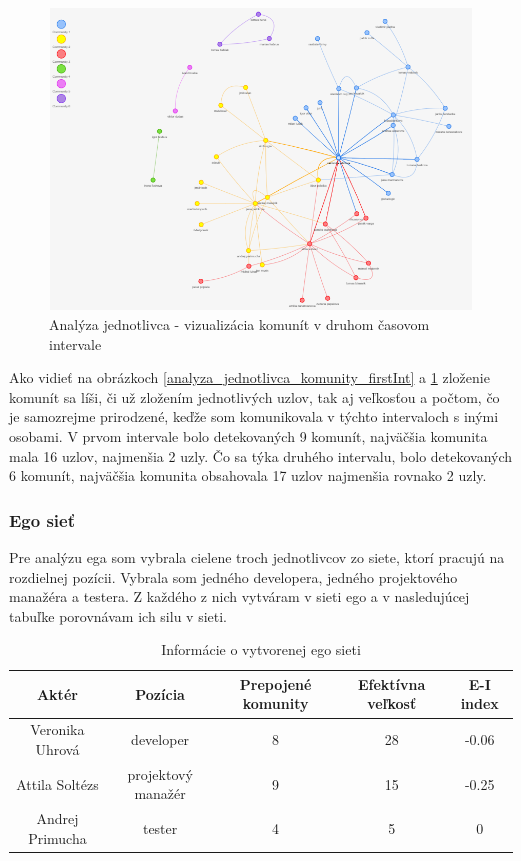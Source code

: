 \documentclass[slovak,master,public,dept460,male,cpdeclaration,oneside]{diploma}
\begin{document}
\begin{figure}[H]
\centering
\includegraphics[width=12cm, height=8cm]{figures/analyza_jednotlivca_komunity_secondInt}
\caption{Analýza jednotlivca - vizualizácia komunít v druhom časovom intervale}
\label{analyza_jednotlivca_komunity_secondInt}
\end{figure}

Ako vidieť na obrázkoch \ref{analyza_jednotlivca_komunity_firstInt} a \ref{analyza_jednotlivca_komunity_secondInt} zloženie komunít sa líši, či už zložením jednotlivých uzlov, tak aj veľkosťou a počtom, čo je samozrejme prirodzené, keďže som komunikovala v týchto intervaloch s inými osobami. V prvom intervale bolo detekovaných 9 komunít, najväčšia komunita mala 16 uzlov, najmenšia 2 uzly. Čo sa týka druhého intervalu, bolo detekovaných 6 komunít, najväčšia komunita obsahovala 17 uzlov najmenšia rovnako 2 uzly.


\subsubsection{Ego sieť}
Pre analýzu ega som vybrala cielene troch jednotlivcov zo siete, ktorí pracujú na rozdielnej pozícii. Vybrala som jedného developera, jedného projektového manažéra a testera. Z každého z nich vytváram v sieti ego a v nasledujúcej tabuľke porovnávam ich silu v sieti.

\begin{table}[h!]
\centering
\begin{tabular}{ |c|c|c|c|c| }
 \hline
 Aktér & Pozícia & Prepojené komunity & Efektívna veľkosť & E-I index \\ 
 \hline
Veronika Uhrová  & developer  & 8  & 28  &  -0.06 \\  
  \hline
  Attila Soltézs &  projektový manažér  &  9 & 15 & -0.25  \\ 
  \hline
  Andrej Primucha & tester   &  4 &  5 & 0  \\ 
  \hline

\end{tabular}
\caption{Informácie o vytvorenej ego sieti}
\end{table} 
\end{document}
